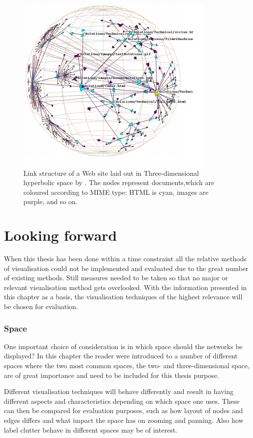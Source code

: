 \documentclass[a4paper,11pt]{kth-mag}
\begin{document}
 \begin{figure}[!htbp]
	\centering
	\includegraphics[scale=0.5]{HyperBolicEx1}
	\caption{Link structure of a Web site laid out in Three-dimensional hyperbolic space by \cite{636718}. The nodes represent documents,which are coloured
according to MIME type: HTML is cyan, images are purple, and so on.}
	\label{fig:hyperbolic_example}
\end{figure}

\newpage
\section{Looking forward} 
When this thesis has been done within a time constraint all the relative methods of visualisation could not be implemented and evaluated due to the great number of existing methods. Still measures needed to be
taken so that no major or relevant visualisation method gets overlooked. With the information presented in this chapter as a basis, the visualisation techniques of the highest relevance will be
 chosen for evaluation.
\subsubsection{Space}
One important choice of consideration is in which space should the networks be displayed? In this chapter the reader were introduced to a number of different spaces where the two most common spaces,
 the two- and three-dimensional space, are of great importance and need to be included for this thesis purpose.

Different visualisation techniques will behave differently and result in having different aspects and characteristics depending on which space one uses. These can then be compared for evaluation purposes,
such as how layout of nodes and edges differs and what impact the space has on zooming and panning. Also how label clutter behave in different spaces may be of interest.
\end{document}
